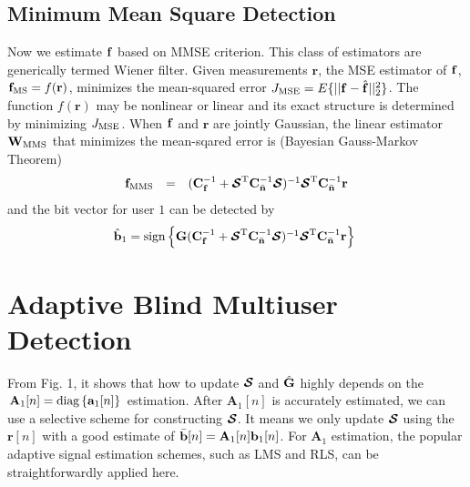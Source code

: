 \documentclass[a4paper,10pt,fleqn, twocolumn]{IEEETran}
\newcommand{\br}{{\mathbf r}}
\newcommand{\bA}{{\mathbf A}}
\newcommand{\ba}{{\bf a}}
\newcommand{\bb}{{\bf b}}
\newcommand{\bC}{{\bf C}}
\newcommand{\bG}{{\bf G}}
\newcommand{\bn}{{\bf n}}
\newcommand{\bbf}{{\bf f}}
\newcommand{\bW}{{\bf W}}
\newcommand{\bcS}{{\mbox {\boldmath ${\cal S}$}}}
\begin{document}
\subsection{Minimum Mean Square Detection}

Now we estimate $\bbf$ based on MMSE criterion. This class of
estimators are generically termed Wiener filter. Given
measurements $\br$, the MSE estimator of $\bbf$, ${\bbf}_{\rm MS}
= f( \br )$, minimizes the mean-squared error $J_{\rm
MSE}=E\{||\bbf-\hat{\bbf}||_2^2\}$. The function $f(\br)$ may be
nonlinear or linear and its exact structure is determined by
minimizing $J_{\rm MSE}$. When $\bbf$ and $\br$ are jointly
Gaussian, the linear estimator $\bW_{\rm MMS}$ that minimizes the
mean-sqared error is (Bayesian Gauss-Markov Theorem)
\begin{equation}
\begin{array}{rcl}
{\bbf}_{\rm MMS}&=&(\bC_{\bbf}^{-1}+\bcS^{\rm
T}\bC_{\bar{\bn}}^{-1}\bcS)^{-1}\bcS^{\rm
T}\bC_{\bar{\bn}}^{-1}\br
\end{array} \label{MSE}
\end{equation}
\noindent and the bit vector for user $1$ can be detected by
\begin{equation}\hspace{-0.05in}
\begin{array}{l}
\hat{\bb}_1=\mbox{sign}\left\{\bG(\bC_{\bbf}^{-1}+\bcS^{\rm
T}\bC_{\bar{\bn}}^{-1}\bcS)^{-1}\bcS^{\rm
T}\bC_{\bar{\bn}}^{-1}\br\right\}
\end{array}
\end{equation}

\section{ Adaptive Blind Multiuser Detection\label{updatingG}}

\begin{figure}
\label{AMUDstruct}
\end{figure}

From Fig. 1, it shows that how to update $\bcS$ and $\hat{\bG}$
highly depends on the
${\bA}_1[n]=\mbox{diag}\left\{{\ba}_1[n]\right\}$ estimation.
After ${\bA}_1[n]$ is accurately estimated, we can use a selective
scheme for constructing $\bcS$. It means we only update $\bcS$
using the $\br[n]$ with a good estimate of
$\bar{\bb}[n]=\bA_1[n]\bb_1[n]$. For $\bA_1$ estimation, the
popular adaptive signal estimation schemes, such as LMS and RLS,
can be straightforwardly applied here.
\end{document}
